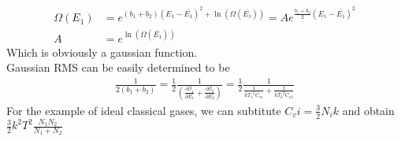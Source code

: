 \documentclass{article}
\begin{document}
\begin{align}
\Omega(E_1)&=e^{(b_1+b_2)(E_1-\bar{E_1})^2+\ln(\Omega(\bar{E_1}))}=Ae^{\frac{b_1+b_2}{2}(E_1-\bar{E_1})^2}\\
A&=e^{\ln(\Omega(\bar{E_1}))}
\end{align}
Which is obviously a gaussian function.\\
Gaussian RMS can be easily determined to be
\begin{align}
\frac{1}{2(b_1+b_2)}=\frac{1}{2}\frac{1}{(\frac{\partial \beta_1}{\partial E_1}+\frac{\partial \beta_2}{\partial E_2})}=\frac{1}{2}\frac{1}{\frac{1}{k{T_1}^2C_{v1}}+\frac{1}{k{T_2}^2C_{v2}}}
\end{align}
For the example of ideal classical gases, we can subtitute $C_vi=\frac{3}{2}N_ik$ and obtain $\frac{3}{2}k^2T^2\frac{N_1N_2}{N_1+N_2}$\\
\end{document}
